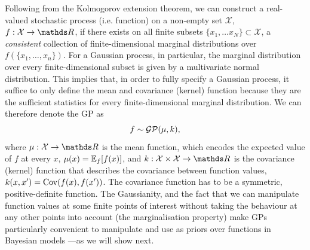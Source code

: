 Following from the Kolmogorov extension theorem, we can construct a real-valued stochastic process (i.e. function) on a non-empty set $\mathcal{X}$, $f: \mathcal{X} \rightarrow \Reals$, if there exists on all finite subsets $\{x_1, \ldots x_N\} \subset \mathcal{X}$, a \emph{consistent} collection of finite-dimensional marginal distributions over $f(\{x_1, \ldots, x_n\})$. For a Gaussian process, in particular, the marginal distribution over every finite-dimensional subset is given by a multivariate normal distribution. This implies that, in order to fully specify a Gaussian process, it suffice to only define the mean and covariance (kernel) function because they are the sufficient statistics for every finite-dimensional marginal distribution. We can therefore denote the GP as
\begin{equation}
  \label{eq:chapter1:def-gp}
  f \sim \mathcal{GP}(\mu, k),
\end{equation}
where $\mu:\mathcal{X}\rightarrow\Reals$ is the mean function, which encodes the expected value of $f$ at every $x$, $\mu(x) = \Exp{f}{f(x)}$, and $k:\mathcal{X} \times \mathcal{X} \rightarrow \Reals$ is the covariance (kernel) function that describes the covariance between function values, $k(x, x') = \Cov\left(f(x), f(x')\right)$. The covariance function has to be a symmetric, positive-definite function. The Gaussianity, and the fact that we can manipulate function values at some finite points of interest without taking the behaviour at any other points into account (the marginalisation property) make GPs particularly convenient to manipulate and use as priors over functions in Bayesian models ---as we will show next.

